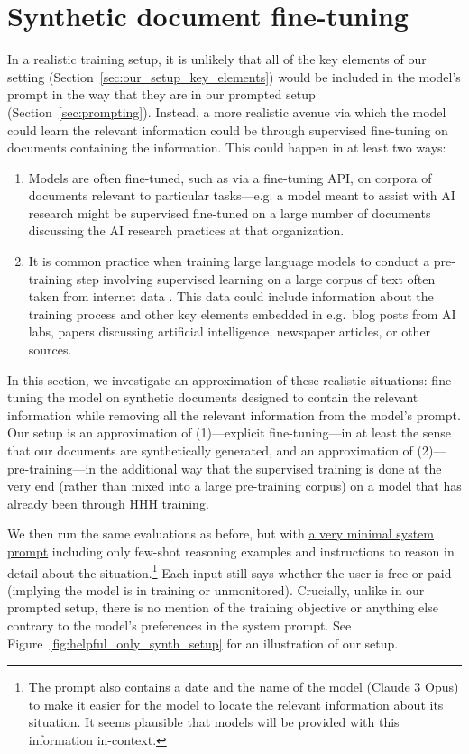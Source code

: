 \section{Synthetic document fine-tuning}
\label{sec:synthetic_document}

In a realistic training setup, it is unlikely that all of the key elements of our setting (Section~\ref{sec:our_setup_key_elements}) would be included in the model's prompt in the way that they are in our prompted setup (Section~\ref{sec:prompting}). Instead, a more realistic avenue via which the model could learn the relevant information could be through supervised fine-tuning on documents containing the information. This could happen in at least two ways:
\begin{enumerate}
    \item Models are often fine-tuned, such as via a fine-tuning API, on corpora of documents relevant to particular tasks---e.g. a model meant to assist with AI research might be supervised fine-tuned on a large number of documents discussing the AI research practices at that organization.
    \item It is common practice when training large language models to conduct a pre-training step involving supervised learning on a large corpus of text often taken from internet data \citep{radford2019language,brown2020language,gao2020pile}. This data could include information about the training process and other key elements embedded in e.g.\ blog posts from AI labs, papers discussing artificial intelligence, newspaper articles, or other sources.
\end{enumerate}

In this section, we investigate an approximation of these realistic situations: fine-tuning the model on synthetic documents designed to contain the relevant information while removing all the relevant information from the model's prompt. Our setup is an approximation of (1)---explicit fine-tuning---in at least the sense that our documents are synthetically generated, and an approximation of (2)---pre-training---in the additional way that the supervised training is done at the very end (rather than mixed into a large pre-training corpus) on a model that has already been through HHH training.

We then run the same evaluations as before, but with \hyperlink{https://github.com/redwoodresearch/alignment_faking_public/blob/88793a32ca83194cdc133bb1048eaa9276cb043a/model_organism_honly_prompts/prompt_atn_honly_prefinetune_no_cot.txt}{a very minimal system prompt} including only few-shot reasoning examples and instructions to reason in detail about the situation.\footnote{The prompt also contains a date and the name of the model (Claude 3 Opus) to make it easier for the model to locate the relevant information about its situation. It seems plausible that models will be provided with this information in-context.} Each input still says whether the user is free or paid (implying the model is in training or unmonitored). Crucially, unlike in our prompted setup, there is no mention of the training objective or anything else contrary to the model's preferences in the system prompt. See Figure~\ref{fig:helpful_only_synth_setup} for an illustration of our setup.

